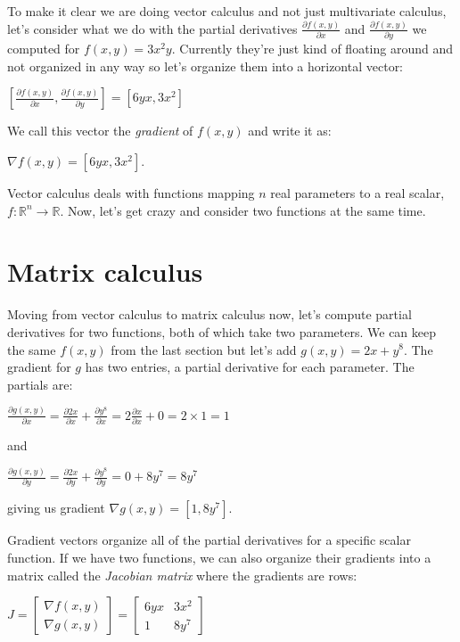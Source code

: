 \documentclass[11pt]{article}
\begin{document}
To make it clear we are doing vector calculus and not just multivariate calculus, let's consider what we do with the partial derivatives $\frac{\partial f(x,y)}{\partial x}$ and $\frac{\partial f(x,y)}{\partial y}$ we computed for $f(x,y) = 3x^2y$. Currently they're just kind of floating around and not organized in any way so let's organize them into a horizontal vector:

$[ \frac{\partial f(x,y)}{\partial x}, \frac{\partial f(x,y)}{\partial y}] = [6yx, 3x^2]$

We call this vector the {\em gradient} of $f(x,y)$ and write it as:

$\nabla f(x,y) = [6yx, 3x^2]$.

Vector calculus deals with functions mapping $n$ real parameters to a real scalar, $f : \mathbb{R}^n \rightarrow \mathbb{R}$.  Now, let's get crazy and consider two functions at the same time.

\section{Matrix calculus}

Moving from vector calculus to matrix calculus now, let's compute partial derivatives for two functions, both of which take two parameters.  We can keep the same $f(x,y)$ from the last section but let's add $g(x,y) = 2x + y^8$.  The gradient for $g$ has two entries, a partial derivative for each parameter. The partials are:

$\frac{\partial g(x,y)}{\partial x} = \frac{\partial 2x}{\partial x} + \frac{\partial y^8}{\partial x} = 2\frac{\partial x}{\partial x} + 0 = 2 \times 1 = 1$

and

$\frac{\partial g(x,y)}{\partial y} = \frac{\partial 2x}{\partial y} + \frac{\partial y^8}{\partial y} = 0 + 8y^7 = 8y^7$

giving us gradient $\nabla g(x,y) = [1, 8y^7]$.

Gradient vectors organize all of the partial derivatives for a specific scalar function. If we have two functions, we can also organize their gradients into a matrix called the {\em Jacobian matrix} where the gradients are rows:

$J =
\begin{bmatrix}
	\nabla f(x,y)\\
	\nabla g(x,y)
\end{bmatrix} = \begin{bmatrix}
	6yx & 3x^2\\
	1 & 8y^7
\end{bmatrix}
$
\end{document}
